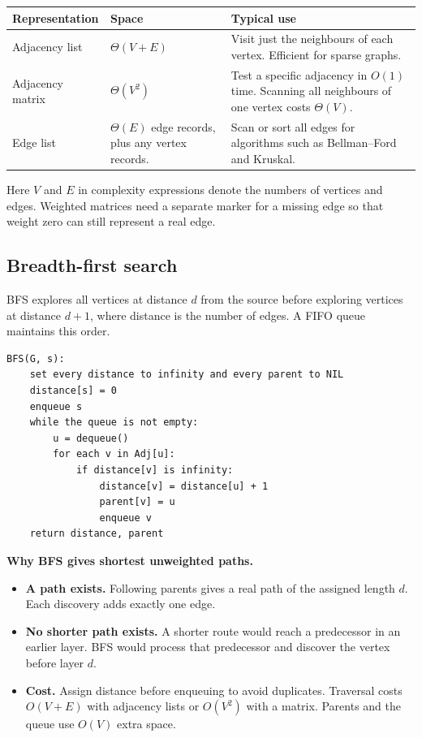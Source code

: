 \documentclass[12pt,a4paper]{article}
\begin{document}
\par\vspace{5pt}
\begingroup
\setlength{\extrarowheight}{1pt}
\noindent\begin{tabularx}{\linewidth}{|B{3.5cm}|Y|Y|}
\hline
\textbf{Representation} & \textbf{Space} & \textbf{Typical use} \\ \hline
Adjacency list & $\Theta(V+E)$ & Visit just the neighbours of each vertex. Efficient for sparse graphs. \\ \hline
Adjacency matrix & $\Theta(V^2)$ & Test a specific adjacency in $O(1)$ time. Scanning all neighbours of one vertex costs $\Theta(V)$. \\ \hline
Edge list & $\Theta(E)$ edge records, plus any vertex records. & Scan or sort all edges for algorithms such as Bellman--Ford and Kruskal. \\ \hline
\end{tabularx}\par
\endgroup
Here $V$ and $E$ in complexity expressions denote the numbers of vertices and edges. Weighted matrices need a separate marker for a missing edge so that weight zero can still represent a real edge.

\subsection{Breadth-first search}
\begin{tcolorbox}[defbox, title={Breadth-first search (BFS)}]
BFS explores all vertices at distance $d$ from the source before exploring vertices at distance $d+1$, where distance is the number of edges. A FIFO queue maintains this order.
\end{tcolorbox}

\begin{tcolorbox}[formulabox, title={BFS for unweighted shortest paths}]
\begin{verbatim}
BFS(G, s):
    set every distance to infinity and every parent to NIL
    distance[s] = 0
    enqueue s
    while the queue is not empty:
        u = dequeue()
        for each v in Adj[u]:
            if distance[v] is infinity:
                distance[v] = distance[u] + 1
                parent[v] = u
                enqueue v
    return distance, parent
\end{verbatim}
\end{tcolorbox}

\textbf{Why BFS gives shortest unweighted paths.}
\begin{itemize}[leftmargin=*, itemsep=2pt]
  \item \textbf{A path exists.} Following parents gives a real path of the assigned length $d$. Each discovery adds exactly one edge.
  \item \textbf{No shorter path exists.} A shorter route would reach a predecessor in an earlier layer. BFS would process that predecessor and discover the vertex before layer $d$.
  \item \textbf{Cost.} Assign distance before enqueuing to avoid duplicates. Traversal costs $O(V+E)$ with adjacency lists or $O(V^2)$ with a matrix. Parents and the queue use $O(V)$ extra space.
\end{itemize}
\end{document}
